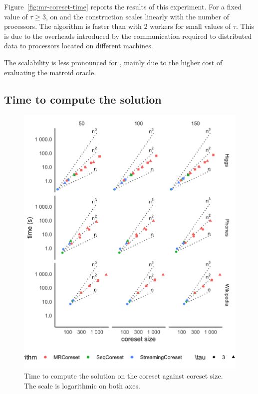 Figure~\ref{fig:mr-coreset-time} reports the results of this experiment. 
For a fixed value of $\tau \ge 3$, on \higgs and \phones the \mapr construction scales linearly with the 
number of processors. 
The \seq algorithm is faster than \mapr with 2 workers for small values of $\tau$. 
This is due to the overheads introduced by the communication required to distributed data to
processors located on different machines.

The scalability is less pronounced for \wiki, mainly due to the higher cost of evaluating the matroid oracle.

\subsection{Time to compute the solution}

\begin{figure}
    \includegraphics[width=\columnwidth]{solution-time.png}
    \caption{
        \label{fig:solution-time}
        Time to compute the solution on the coreset against coreset size.
        The scale is logarithmic on both axes.
    }
\end{figure}

